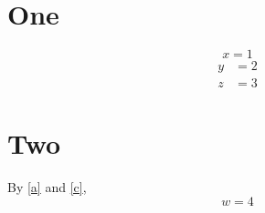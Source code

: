 \documentclass{article}
\begin{document}
\section{One}
\begin{equation}
x = 1 \label{a}
\end{equation}
\begin{align}
y &= 2 \\
z &= 3
\end{align}
\section{Two}
By \eqref{a} and \eqref{c},
\begin{equation}
w = 4 \label{c}
\end{equation}
\end{document}
